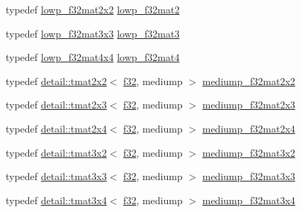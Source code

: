 \begin{DoxyCompactItemize}
\item 
typedef \hyperlink{group__gtc__type__precision_gae5beaa9212ba199167c7c7088a70b2bd}{lowp\+\_\+f32mat2x2} \hyperlink{group__gtc__type__precision_gad717448ef1129d7b795ebcfee6c4944c}{lowp\+\_\+f32mat2}
\item 
typedef \hyperlink{group__gtc__type__precision_ga92f4b130a9651c69361600272f113542}{lowp\+\_\+f32mat3x3} \hyperlink{group__gtc__type__precision_ga84500ab23c0f0f3c585f8ad02f33b88c}{lowp\+\_\+f32mat3}
\item 
typedef \hyperlink{group__gtc__type__precision_gab7a6454e1f5d5c434ff316b139eb0231}{lowp\+\_\+f32mat4x4} \hyperlink{group__gtc__type__precision_gada4d11f44b410c1be7b6b1d05ccf692c}{lowp\+\_\+f32mat4}
\item 
typedef \hyperlink{structglm_1_1detail_1_1tmat2x2}{detail\+::tmat2x2}$<$ \hyperlink{group__gtc__type__precision_ga0ec999b57f5330d9021256e96038df04}{f32}, mediump $>$ \hyperlink{group__gtc__type__precision_ga23c9239d6aa9b41c3d2145e2faa81edb}{mediump\+\_\+f32mat2x2}
\item 
typedef \hyperlink{structglm_1_1detail_1_1tmat2x3}{detail\+::tmat2x3}$<$ \hyperlink{group__gtc__type__precision_ga0ec999b57f5330d9021256e96038df04}{f32}, mediump $>$ \hyperlink{group__gtc__type__precision_ga42497d19668931d225bccf1b9c614c19}{mediump\+\_\+f32mat2x3}
\item 
typedef \hyperlink{structglm_1_1detail_1_1tmat2x4}{detail\+::tmat2x4}$<$ \hyperlink{group__gtc__type__precision_ga0ec999b57f5330d9021256e96038df04}{f32}, mediump $>$ \hyperlink{group__gtc__type__precision_ga20c5b3b715b70f1c09f7f95bfaa7aa84}{mediump\+\_\+f32mat2x4}
\item 
typedef \hyperlink{structglm_1_1detail_1_1tmat3x2}{detail\+::tmat3x2}$<$ \hyperlink{group__gtc__type__precision_ga0ec999b57f5330d9021256e96038df04}{f32}, mediump $>$ \hyperlink{group__gtc__type__precision_ga9762d48bb9b41e3cf40f6e616cf61b6b}{mediump\+\_\+f32mat3x2}
\item 
typedef \hyperlink{structglm_1_1detail_1_1tmat3x3}{detail\+::tmat3x3}$<$ \hyperlink{group__gtc__type__precision_ga0ec999b57f5330d9021256e96038df04}{f32}, mediump $>$ \hyperlink{group__gtc__type__precision_gad4d01189a1462366b143c5cbc3de0ea9}{mediump\+\_\+f32mat3x3}
\item 
typedef \hyperlink{structglm_1_1detail_1_1tmat3x4}{detail\+::tmat3x4}$<$ \hyperlink{group__gtc__type__precision_ga0ec999b57f5330d9021256e96038df04}{f32}, mediump $>$ \hyperlink{group__gtc__type__precision_ga7ad59b967576d930f4c8aa7b8c48e1af}{mediump\+\_\+f32mat3x4}

\end{DoxyCompactItemize}
